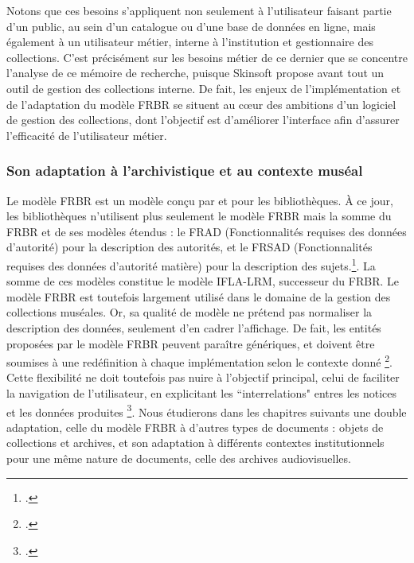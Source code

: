 Notons que ces besoins s'appliquent non seulement à l'utilisateur faisant partie d'un public, au sein d'un catalogue ou d'une base de données en ligne, mais également à un utilisateur métier, interne à l'institution et gestionnaire des collections. C'est précisément sur les besoins métier de ce dernier que se concentre l'analyse de ce mémoire de recherche, puisque Skinsoft propose avant tout un outil de gestion des collections interne. De fait, les enjeux de l'implémentation et de l'adaptation du modèle \gls{FRBR} se situent au cœur des ambitions d'un logiciel de gestion des collections, dont l’objectif est d’améliorer l’interface afin d’assurer l’efficacité de l’utilisateur métier.  









\subsubsection{Son adaptation à l'archivistique et au contexte muséal}

Le modèle \gls{FRBR} est un modèle conçu par et pour les bibliothèques. À ce jour, les bibliothèques n'utilisent plus seulement le modèle FRBR mais la somme du FRBR et de ses modèles étendus : le \gls{FRAD} (Fonctionnalités requises des données d'autorité) pour la description des autorités, et le FRSAD (Fonctionnalités requises des données d'autorité matière) pour la description des sujets.\footcite{zotero-item-651}. La somme de ces modèles constitue le modèle \gls{IFLA-LRM}, successeur du \gls{FRBR}. Le modèle \gls{FRBR} est toutefois largement utilisé dans le domaine de la gestion des collections muséales. Or, sa qualité de modèle ne prétend pas normaliser la description des données, seulement d’en cadrer l’affichage. De fait, les entités proposées par le modèle \gls{FRBR} peuvent paraître génériques, et doivent être soumises à une redéfinition à chaque implémentation selon le contexte donné \footcite{boeuf2008}. Cette flexibilité ne doit toutefois pas nuire à l'objectif principal, celui de faciliter la navigation de l'utilisateur, en explicitant les “interrelations" entres les notices et les données produites \footcite{boeuf2008}. Nous étudierons dans les chapitres suivants une double adaptation, celle du modèle \gls{FRBR} à d’autres types de documents : objets de collections et archives, et son adaptation à différents contextes institutionnels pour une même nature de documents, celle des archives audiovisuelles.  

